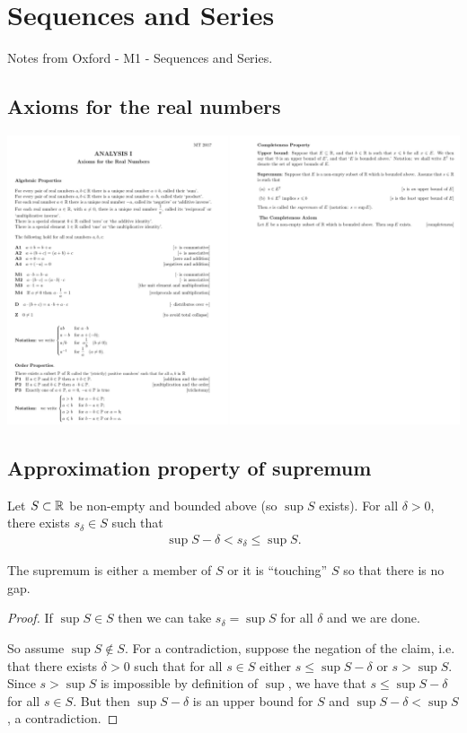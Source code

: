 \section{Sequences and Series}

Notes from Oxford - M1 - Sequences and Series.

\subsection{Axioms for the real numbers}
\begin{mdframed}
\includegraphics[width=400pt]{img/oxford-prelims-M2-analysis-I-axioms-for-real-numbers.png}
\end{mdframed}

\subsection{Approximation property of supremum}
\begin{theorem*}
  Let $S \subset \mathbb{R}$ be non-empty and bounded above (so $\sup S$ exists). For all $\delta > 0$,
  there exists $s_\delta \in S$ such that
  \begin{align*}
    \sup S - \delta < s_\delta \leq \sup S.
  \end{align*}
  \begin{intuition*}
    The supremum is either a member of $S$ or it is ``touching'' $S$ so that there is no gap.
  \end{intuition*}
  \begin{proof}
    If $\sup S \in S$ then we can take $s_\delta = \sup S$ for all $\delta$ and we are done.

    So assume $\sup S \not\in S$. For a contradiction, suppose the negation of the claim, i.e. that
    there exists $\delta > 0$ such that for all $s \in S$ either $s \leq \sup S - \delta$ or
    $s > \sup S$. Since $s > \sup S$ is impossible by definition of $\sup$, we have that
    $s \leq \sup S - \delta$ for all $s \in S$. But then $\sup S - \delta$ is an upper bound for
    $S$ and $\sup S - \delta < \sup S$, a contradiction.
  \end{proof}
\end{theorem*}

